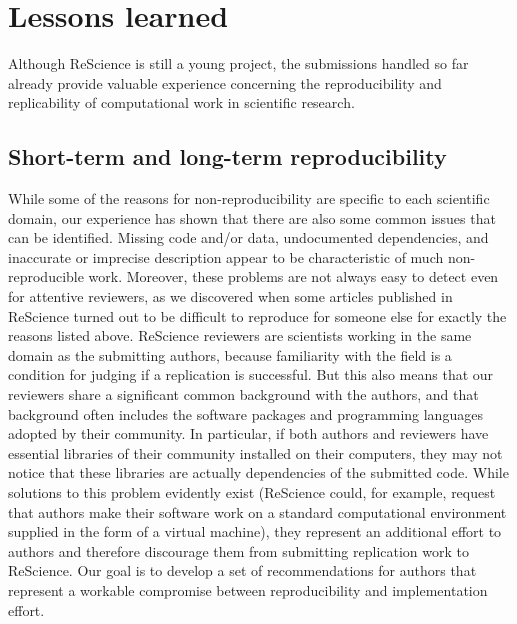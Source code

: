 \documentclass[11pt]{article}
\begin{document}
\section*{Lessons learned}

Although ReScience is still a young project, the submissions handled
so far already provide valuable experience concerning the
reproducibility and replicability of computational work in scientific
research.

\subsection*{Short-term and long-term reproducibility}

While some of the reasons for non-reproducibility are specific to each
scientific domain, our experience has shown that there are also some
common issues that can be identified.  Missing code and/or data,
undocumented dependencies, and inaccurate or imprecise description
appear to be characteristic of much non-reproducible work. Moreover,
these problems are not always easy to detect even for attentive
reviewers, as we discovered when some articles published in ReScience
turned out to be difficult to reproduce for someone else for exactly
the reasons listed above. ReScience reviewers are scientists working
in the same domain as the submitting authors, because familiarity with
the field is a condition for judging if a replication is
successful. But this also means that our reviewers share a significant
common background with the authors, and that background often includes the
software packages and programming languages adopted by their
community.  In particular, if both authors and reviewers have
essential libraries of their community installed on their computers,
they may not notice that these libraries are actually dependencies of
the submitted code.  While solutions to this problem evidently exist
(ReScience could, for example, request that authors make their
software work on a standard computational environment supplied in the
form of a virtual machine), they represent an additional effort to
authors and therefore discourage them from submitting replication work to
ReScience.  Our goal is to develop a set of recommendations for
authors that represent a workable compromise between reproducibility
and implementation effort.\\
\end{document}
